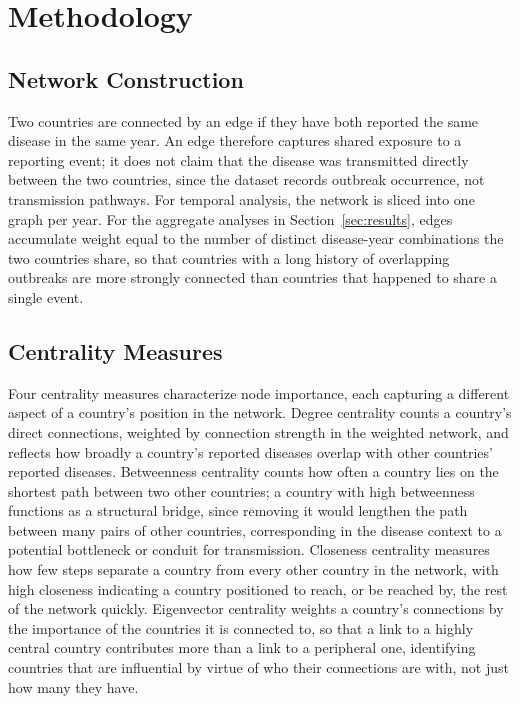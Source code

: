 \documentclass[11pt]{article}
\begin{document}
\section{Methodology}
\label{sec:methodology}

\subsection{Network Construction}

Two countries are connected by an edge if they have both reported the same disease in the
same year. An edge therefore captures shared exposure to a reporting event; it does not
claim that the disease was transmitted directly between the two countries, since the
dataset records outbreak occurrence, not transmission pathways. For temporal analysis, the
network is sliced into one graph per year. For the aggregate analyses in
Section~\ref{sec:results}, edges accumulate weight equal to the number of distinct
disease-year combinations the two countries share, so that countries with a long history of
overlapping outbreaks are more strongly connected than countries that happened to share a
single event.

\subsection{Centrality Measures}

Four centrality measures characterize node importance, each capturing a different aspect of
a country's position in the network. Degree centrality counts a country's direct
connections, weighted by connection strength in the weighted network, and reflects how
broadly a country's reported diseases overlap with other countries' reported diseases.
Betweenness centrality counts how often a country lies on the shortest path between two
other countries; a country with high betweenness functions as a structural bridge, since
removing it would lengthen the path between many pairs of other countries, corresponding in
the disease context to a potential bottleneck or conduit for transmission. Closeness
centrality measures how few steps separate a country from every other country in the
network, with high closeness indicating a country positioned to reach, or be reached by,
the rest of the network quickly. Eigenvector centrality weights a country's connections by
the importance of the countries it is connected to, so that a link to a highly central
country contributes more than a link to a peripheral one, identifying countries that are
influential by virtue of who their connections are with, not just how many they have.
\end{document}
